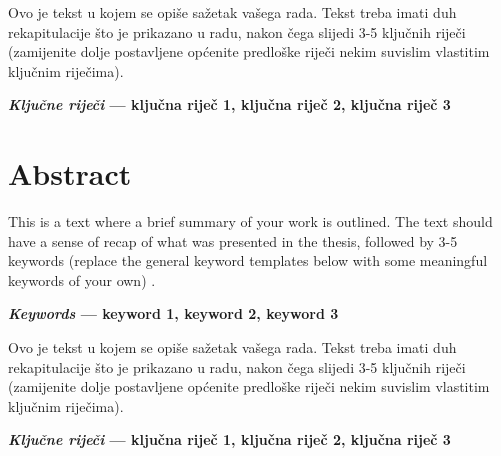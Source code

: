 \vspace{5pt}

\noindent
Ovo je tekst u kojem se opiše sažetak vašega rada. Tekst treba imati duh rekapitulacije što je prikazano u radu, nakon čega slijedi 3-5 ključnih riječi (zamijenite dolje postavljene općenite predloške riječi nekim suvislim vlastitim ključnim riječima).

\vspace{5pt}
%
\noindent \textbf{\textit{Ključne riječi} --- ključna riječ 1, ključna riječ 2, ključna riječ 3} 




\section*{Abstract}
\vspace{-10pt}
This is a text where a brief summary of your work is outlined. The text should have a sense of recap of what was presented in the thesis, followed by 3-5 keywords (replace the general keyword templates below with some meaningful keywords of your own) .

\vspace{5pt}
%
\noindent \textbf{\textit{Keywords} --- keyword 1, keyword 2, keyword 3}


\vspace{5pt}

\noindent
Ovo je tekst u kojem se opiše sažetak vašega rada. Tekst treba imati duh rekapitulacije što je prikazano u radu, nakon čega slijedi 3-5 ključnih riječi (zamijenite dolje postavljene općenite predloške riječi nekim suvislim vlastitim ključnim riječima).

\vspace{5pt}
%
\noindent \textbf{\textit{Ključne riječi} --- ključna riječ 1, ključna riječ 2, ključna riječ 3} 

